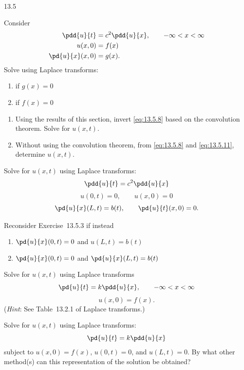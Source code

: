 \begin{exercises}{13.5}

\item Consider
\begin{align*}
\pdd{u}{t} &= c^2\pdd{u}{x}, \qquad -\infty < x < \infty \\
u(x,0) &= f(x) \\
\pd{u}{x}(x,0) &= g(x).
\end{align*}
Solve using Laplace transforms:
\begin{enumerate}
\item[(a)] if $g(x) = 0$
\item[(b)] if $f(x) = 0$
\end{enumerate}

\item
\begin{enumerate}
\item[(a)] Using the results of this section, invert \eqref{eq:13.5.8} based on the convolution theorem.  Solve for $u(x,t)$.
\item[(b)] Without using the convolution theorem, from \eqref{eq:13.5.8} and \eqref{eq:13.5.11}, determine $u(x,t)$.
\end{enumerate}

\item[\starred 13.5.3.] Solve for $u(x,t)$ using Laplace transforms:
\[
\pdd{u}{t} = c^2\pdd{u}{x}
\]
\[
u(0,t) = 0, \qquad u(x,0) = 0
\]
\[
\pd{u}{x}(L,t) = b(t), \qquad \pd{u}{t}(x,0) = 0.
\]

\item Reconsider Exercise~13.5.3 if instead
\begin{enumerate}
\item[(a)] $\pd{u}{x}(0,t) = 0$ and $u(L,t) = b(t)$
\item[(b)] $\pd{u}{x}(0,t) = 0$ and $\pd{u}{x}(L,t) = b(t)$
\end{enumerate}

\item Solve for $u(x,t)$ using Laplace transforms
\[
\pd{u}{t} = k\pdd{u}{x}, \qquad -\infty < x < \infty
\]
\[
u(x,0) = f(x).
\]
(\emph{Hint}: See Table~13.2.1 of Laplace transforms.)

\item Solve for $u(x,t)$ using Laplace transforms:
\[
\pd{u}{t} = k\pdd{u}{x}
\]
subject to $u(x,0) = f(x)$, $u(0,t) = 0$, and $u(L,t) = 0$.  By what other method(s) can this representation of the solution be obtained?

\end{exercises}

